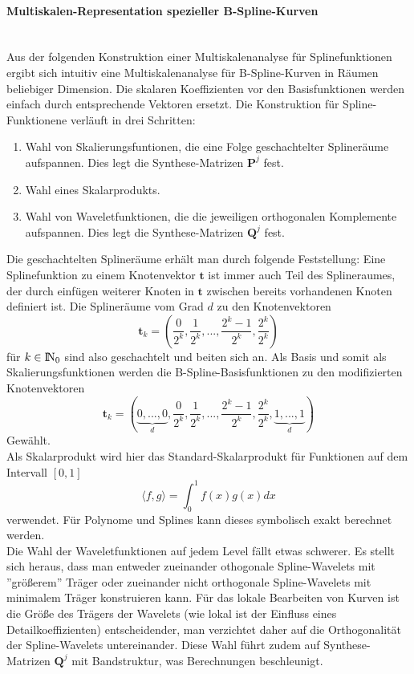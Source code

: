 \documentclass{article}
\newcommand{\N}{{\rm I\!N}}
\begin{document}
\paragraph{Multiskalen-Representation spezieller B-Spline-Kurven}~\\
Aus der folgenden Konstruktion einer Multiskalenanalyse für Splinefunktionen ergibt sich intuitiv eine Multiskalenanalyse für B-Spline-Kurven in Räumen beliebiger Dimension. Die skalaren Koeffizienten vor den  Basisfunktionen werden einfach durch entsprechende Vektoren ersetzt. 
Die Konstruktion für Spline-Funktionene verläuft in drei Schritten: 
\begin{enumerate}
\item Wahl von Skalierungsfuntionen, die eine Folge geschachtelter Splineräume aufspannen. Dies legt die Synthese-Matrizen $\mathbf{P}^j$ fest. 
\item Wahl eines Skalarprodukts. 
\item Wahl von Waveletfunktionen, die die jeweiligen orthogonalen Komplemente aufspannen. Dies legt die Synthese-Matrizen $\mathbf{Q}^j$ fest.
\end{enumerate}
Die geschachtelten Splineräume erhält man durch folgende Feststellung: Eine Splinefunktion zu einem Knotenvektor $\mathbf{t}$ ist immer auch Teil des Splineraumes, der durch einfügen weiterer Knoten in $\mathbf{t}$ zwischen bereits vorhandenen Knoten definiert ist.
Die Splineräume vom Grad $d$ zu den Knotenvektoren
\[
\mathbf{t}_k=(\frac{0}{2^k},\frac{1}{2^k},...,\frac{2^k-1}{2^k},\frac{2^k}{2^k})
\]
für $k\in\N_0$ sind also geschachtelt und beiten sich an. Als Basis und somit als Skalierungsfunktionen werden die B-Spline-Basisfunktionen zu den modifizierten Knotenvektoren
\[
\mathbf{t}_k=(\underbrace{0,...,0}_{d},\frac{0}{2^k},\frac{1}{2^k},...,\frac{2^k-1}{2^k},\frac{2^k}{2^k},\underbrace{1,...,1}_{d})
\]
Gewählt.\\

\noindent Als Skalarprodukt wird hier das Standard-Skalarprodukt für Funktionen auf dem Intervall $[0,1]$
\[
\langle f,g\rangle =\int_0^1f(x)g(x)dx
\]
verwendet. Für Polynome und Splines kann dieses symbolisch exakt berechnet werden.\\

\noindent Die Wahl der Waveletfunktionen auf jedem Level fällt etwas schwerer. Es stellt sich heraus, dass man entweder zueinander othogonale Spline-Wavelets mit ''größerem'' Träger oder zueinander nicht orthogonale Spline-Wavelets mit minimalem Träger konstruieren kann. Für das lokale Bearbeiten von Kurven ist die Größe des Trägers der Wavelets (wie lokal ist der Einfluss eines Detailkoeffizienten) entscheidender, man verzichtet daher auf die Orthogonalität der Spline-Wavelets untereinander. Diese Wahl führt zudem auf Synthese-Matrizen $\mathbf{Q}^j$ mit Bandstruktur, was Berechnungen beschleunigt.
\end{document}
